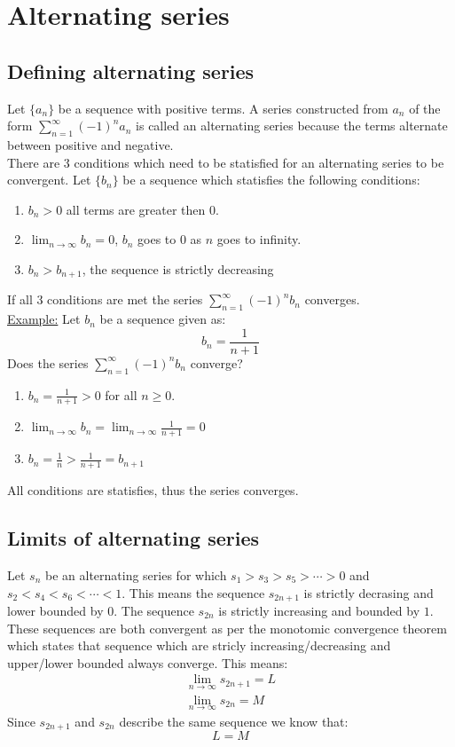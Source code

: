 \documentclass[11pt, a4paper]{article}
\numberwithin{equation}{section}
\numberwithin{figure}{section}
\begin{document}
\setcounter{section}{3}

\section{Alternating series}

\subsection{Defining alternating series}
Let $\{ a_n \}$ be a sequence with positive terms. A series constructed from $a_n$ of the form $\sum_{n=1}^\infty (-1)^n a_n$ is called an alternating series because the terms alternate between positive and negative.\\
There are 3 conditions which need to be statisfied for an alternating series to be convergent. Let $\{ b_n \}$ be a sequence which statisfies the following conditions:
\begin{enumerate}
  \item $b_n > 0$ all terms are greater then $0$.
  \item $\lim_{n\to\infty} b_n = 0$, $b_n$ goes to $0$ as $n$ goes to infinity.
  \item $b_n > b_{n+1}$, the sequence is strictly decreasing
\end{enumerate}
If all 3 conditions are met the series $\sum_{n=1}^\infty (-1)^n b_n$ converges.\\
\newline\underline{Example:} Let $b_n$ be a sequence given as:
\begin{equation*}
  b_n = \frac{1}{n+1}
\end{equation*}
Does the series $\sum_{n=1}^\infty (-1)^n b_n$ converge?
\begin{enumerate}
  \item $b_n = \frac{1}{n+1} > 0$ for all $n\geq 0$.
  \item $\lim_{n\to\infty} b_n = \lim_{n\to\infty} \frac{1}{n+1} = 0$
  \item $b_n = \frac{1}{n} > \frac{1}{n+1} = b_{n+1}$
\end{enumerate}
All conditions are statisfies, thus the series converges.

\subsection{Limits of alternating series}
Let $s_n$ be an alternating series for which $s_1 > s_3 > s_5 > \cdots > 0$ and $s_2 < s_4 < s_6 < \cdots < 1$. This means the sequence $s_{2n+1}$ is strictly decrasing and lower bounded by $0$. The sequence $s_{2n}$ is strictly increasing and bounded by $1$. These sequences are both convergent as per the monotomic convergence theorem which states that sequence which are stricly increasing/decreasing and upper/lower bounded always converge. This means:
\begin{gather}
  \lim_{n\to\infty} s_{2n+1} = L\\
  \lim_{n\to\infty} s_{2n} = M
\end{gather}
Since $s_{2n+1}$ and $s_{2n}$ describe the same sequence we know that:
\begin{equation}
  L = M
\end{equation}
\end{document}
